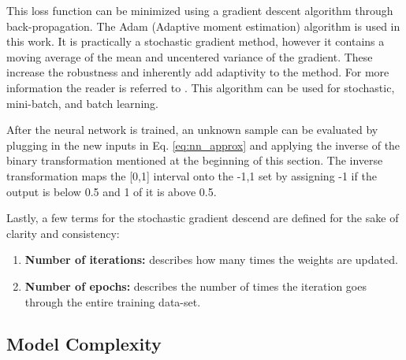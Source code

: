 \documentclass[paper=a4, fontsize=11pt]{scrartcl} %
\begin{document}
This loss function can be minimized using a gradient descent algorithm through back-propagation. 
The Adam (Adaptive moment estimation) algorithm \cite{kingma2014adam} is used in this work.
It is practically a stochastic gradient method, however it contains a moving average of the mean and uncentered variance of the gradient.
These increase the robustness and inherently add adaptivity to the method.
For more information the reader is referred to \cite{kingma2014adam}. 
This algorithm can be used for stochastic, mini-batch, and batch learning.

After the neural network is trained, an unknown sample can be evaluated by plugging in the new inputs in Eq. \eqref{eq:nn_approx} and applying the inverse of the binary transformation mentioned at the beginning of this section.
The inverse transformation maps the [0,1] interval onto the {-1,1} set by assigning -1 if the output is below 0.5 and 1 of it is above 0.5.

Lastly, a few terms for the stochastic gradient descend are defined for the sake of clarity and consistency:
\begin{enumerate}
	\item \textbf{Number of iterations:} describes how many times the weights are updated.
	\item \textbf{Number of epochs:} describes the number of times the iteration goes through the entire training data-set.
\end{enumerate} 
 
\subsection*{Model Complexity}
\end{document}
